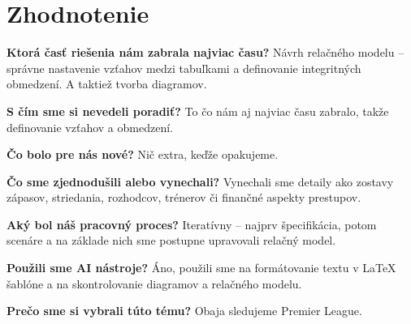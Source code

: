 \documentclass[11pt, a4paper]{article}
\begin{document}
\newpage
\section{Zhodnotenie}
\label{sec:zhodnotenie}
 
\textbf{Ktorá časť riešenia nám zabrala najviac času?}
Návrh relačného modelu -- správne nastavenie vzťahov medzi tabuľkami a definovanie integritných obmedzení. A taktiež tvorba diagramov.
 
\textbf{S čím sme si nevedeli poradiť?}
To čo nám aj najviac času zabralo, takže definovanie vzťahov a obmedzení.
 
\textbf{Čo bolo pre nás nové?}
Nič extra, keďže opakujeme.
 
\textbf{Čo sme zjednodušili alebo vynechali?}
Vynechali sme detaily ako zostavy zápasov, striedania, rozhodcov, trénerov či finančné aspekty prestupov.
 
\textbf{Aký bol náš pracovný proces?}
Iteratívny -- najprv špecifikácia, potom scenáre a na základe nich sme postupne upravovali relačný model.
 
\textbf{Použili sme AI nástroje?}
Áno, použili sme na formátovanie textu v LaTeX šablóne a na skontrolovanie diagramov a relačného modelu.
 
\textbf{Prečo sme si vybrali túto tému?}
Obaja sledujeme Premier League.
 

\printbibliography
\end{document}
